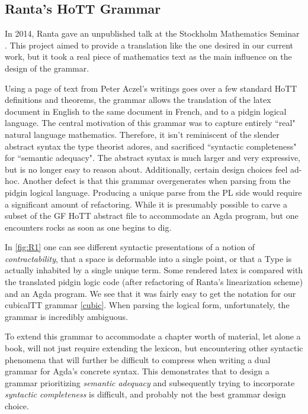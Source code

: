 \subsection{Ranta's HoTT Grammar} \label{rantaHott}

In 2014, Ranta gave an unpublished talk at the Stockholm Mathematics Seminar
\cite{aarneHott}. This project aimed to provide a translation like the one
desired in our current work, but it took a real piece of mathematics text as the
main influence on the design of the grammar.

Using a page of text from Peter Aczel's writings goes over a few
standard HoTT definitions and theorems, the grammar allows the translation of
the latex document in English to the same document in French, and to a pidgin
logical language. The central motivation of this grammar was to capture entirely
``real" natural language mathematics. Therefore, it isn't reminiscent of the
slender abstract syntax the type theorist adores, and sacrificed ``syntactic
completeness" for ``semantic adequacy". The abstract syntax is much larger and
very expressive, but is no longer easy to reason about. Additionally, certain
design choices feel ad-hoc. Another defect is that this grammar overgenerates
when parsing from the pidgin logical language. Producing a unique parse from the
PL side would require a significant amount of refactoring. While it is
presumably possible to carve a subset of the GF HoTT abstract file to
accommodate an Agda program, but one encounters rocks as soon as one begins to
dig.

In \autoref{fig:R1} one can see different syntactic presentations of a notion of
\emph{contractability}, that a space is deformable into a single point, or that
a Type is actually inhabited by a single unique term. Some rendered latex is
compared with the translated pidgin logic code (after refactoring of Ranta's
linearization scheme) and an Agda program. We see that it was fairly easy to get
the notation for our cubicalTT grammar \ref{cubic}. When parsing the logical
form, unfortunately, the grammar is incredibly ambiguous.



To extend this grammar to accommodate a chapter worth of material, let alone a
book, will not just require extending the lexicon, but encountering other
syntactic phenomena that will further be difficult to compress when writing a
dual grammar for Agda's concrete syntax. This demonstrates that to design a
grammar prioritizing \emph{semantic adequacy} and subsequently trying to
incorporate \emph{syntactic completeness} is difficult, and probably not the
best grammar design choice.

